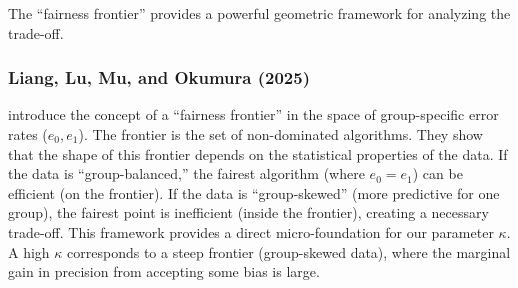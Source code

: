 The ``fairness frontier'' provides a powerful geometric framework for analyzing the trade-off.

\subsubsection{Liang, Lu, Mu, and Okumura (2025)}

\citet{Liang2025} introduce the concept of a ``fairness frontier'' in the space of group-specific error rates ($e_0, e_1$). The frontier is the set of non-dominated algorithms. They show that the shape of this frontier depends on the statistical properties of the data. If the data is ``group-balanced,'' the fairest algorithm (where $e_0 = e_1$) can be efficient (on the frontier). If the data is ``group-skewed'' (more predictive for one group), the fairest point is inefficient (inside the frontier), creating a necessary trade-off. This framework provides a direct micro-foundation for our parameter $\kappa$. A high $\kappa$ corresponds to a steep frontier (group-skewed data), where the marginal gain in precision from accepting some bias is large.

